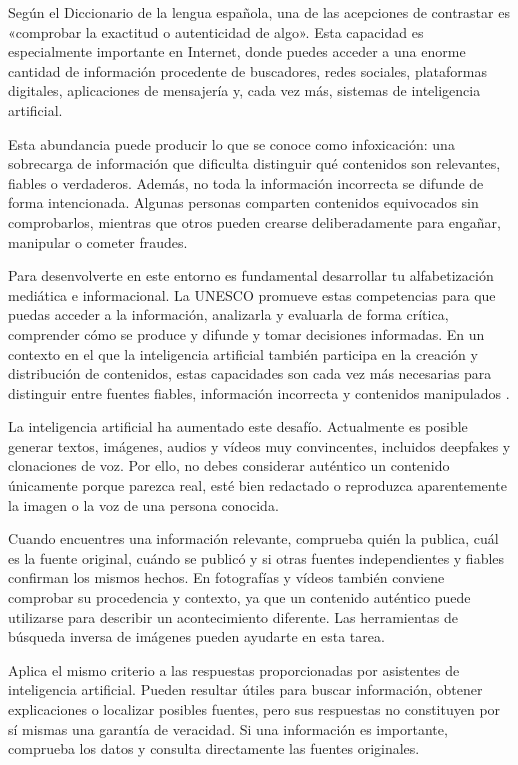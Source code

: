 \documentclass[
  spanish,
  a4paper,
  openany]{book}
\begin{document}
Según el Diccionario de la lengua española, una de las acepciones de contrastar es «comprobar la exactitud o autenticidad de algo». Esta capacidad es especialmente importante en Internet, donde puedes acceder a una enorme cantidad de información procedente de buscadores, redes sociales, plataformas digitales, aplicaciones de mensajería y, cada vez más, sistemas de inteligencia artificial.

Esta abundancia puede producir lo que se conoce como infoxicación: una sobrecarga de información que dificulta distinguir qué contenidos son relevantes, fiables o verdaderos. Además, no toda la información incorrecta se difunde de forma intencionada. Algunas personas comparten contenidos equivocados sin comprobarlos, mientras que otros pueden crearse deliberadamente para engañar, manipular o cometer fraudes.

Para desenvolverte en este entorno es fundamental desarrollar tu alfabetización mediática e informacional. La UNESCO promueve estas competencias para que puedas acceder a la información, analizarla y evaluarla de forma crítica, comprender cómo se produce y difunde y tomar decisiones informadas. En un contexto en el que la inteligencia artificial también participa en la creación y distribución de contenidos, estas capacidades son cada vez más necesarias para distinguir entre fuentes fiables, información incorrecta y contenidos manipulados \citep{UNESCO-alfabetizacion-mediatica}.

La inteligencia artificial ha aumentado este desafío. Actualmente es posible generar textos, imágenes, audios y vídeos muy convincentes, incluidos deepfakes y clonaciones de voz. Por ello, no debes considerar auténtico un contenido únicamente porque parezca real, esté bien redactado o reproduzca aparentemente la imagen o la voz de una persona conocida.

Cuando encuentres una información relevante, comprueba quién la publica, cuál es la fuente original, cuándo se publicó y si otras fuentes independientes y fiables confirman los mismos hechos. En fotografías y vídeos también conviene comprobar su procedencia y contexto, ya que un contenido auténtico puede utilizarse para describir un acontecimiento diferente. Las herramientas de búsqueda inversa de imágenes pueden ayudarte en esta tarea.

Aplica el mismo criterio a las respuestas proporcionadas por asistentes de inteligencia artificial. Pueden resultar útiles para buscar información, obtener explicaciones o localizar posibles fuentes, pero sus respuestas no constituyen por sí mismas una garantía de veracidad. Si una información es importante, comprueba los datos y consulta directamente las fuentes originales.
\end{document}
